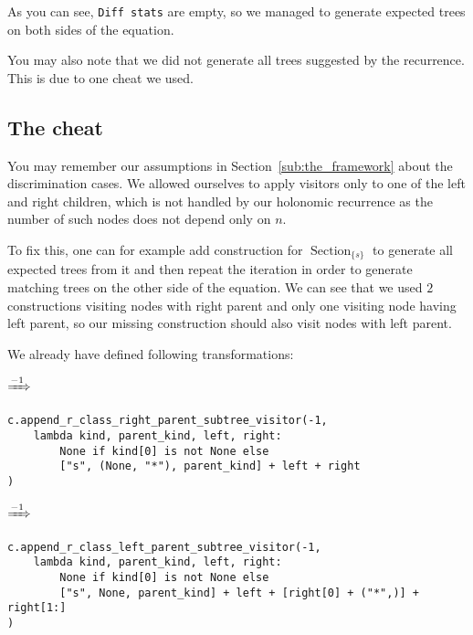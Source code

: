 \documentclass[final]{article}
\theoremstyle{definition}
\theoremstyle{definition}
\theoremstyle{remark}
\DeclareMathOperator{\tSection}{\text{Section}}
\newcommand{\includeinlinescaledsvg}[3]{\begin{minipage}{#1\textwidth}\begin{center}\end{center}\end{minipage}}
\begin{document}
As you can see, \verb|Diff stats| are empty, so we managed to generate expected trees on both sides of the equation.

You may also note that we did not generate all trees suggested by the recurrence. This is due to one cheat we used.

\subsection{The cheat}%
\label{sub:the_cheat}

You may remember our assumptions in Section~\ref{sub:the_framework} about the discrimination cases. We allowed ourselves to apply visitors only to one of the left and right children, which is not handled by our holonomic recurrence as the number of such nodes does not depend only on \(n\).

To fix this, one can for example add construction for \(\tSection_{\{s\}}\) to generate all expected trees from it and then repeat the iteration in order to generate matching trees on the other side of the equation. We can see that we used \(2\) constructions visiting nodes with right parent and only one visiting node having left parent, so our missing construction should also visit nodes with left parent.

We already have defined following transformations:

\begin{center}
    \includeinlinescaledsvg{.4}{.7}{lambda__transformations__003a}%
    \(\xRightarrow{-1}\)%
    \includeinlinescaledsvg{.4}{.7}{lambda__transformations__003b}%
\end{center}

\begin{lstlisting}
c.append_r_class_right_parent_subtree_visitor(-1,
    lambda kind, parent_kind, left, right:
        None if kind[0] is not None else
        ["s", (None, "*"), parent_kind] + left + right
)
\end{lstlisting}

\begin{center}
    \includeinlinescaledsvg{.4}{.7}{lambda__transformations__012a}%
    \(\xRightarrow{-1}\)%
    \includeinlinescaledsvg{.4}{.7}{lambda__transformations__012b}%
\end{center}

\begin{lstlisting}
c.append_r_class_left_parent_subtree_visitor(-1,
    lambda kind, parent_kind, left, right:
        None if kind[0] is not None else
        ["s", None, parent_kind] + left + [right[0] + ("*",)] + right[1:]
)
\end{lstlisting}
\end{document}
